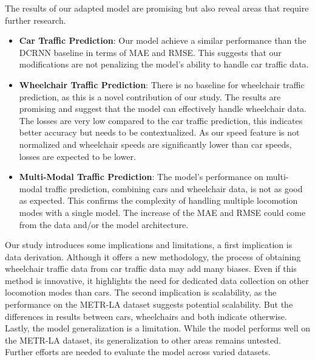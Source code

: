 The results of our adapted model are promising but also reveal areas that require further research.
\begin{itemize}
    \item \textbf{Car Traffic Prediction}:
    Our model achieve a similar performance than the DCRNN baseline in terms of MAE and RMSE\@.
    This suggests that our modifications are not penalizing the model's ability to handle car traffic data.
    \item \textbf{Wheelchair Traffic Prediction}:
    There is no baseline for wheelchair traffic prediction, as this is a novel contribution of our study.
    The results are promising and suggest that the model can effectively handle wheelchair data.
    The losses are very low compared to the car traffic prediction, this indicates better accuracy but needs to be contextualized.
    As our speed feature is not normalized and wheelchair speeds are significantly lower than car speeds, losses are expected to be lower.
    \item \textbf{Multi-Modal Traffic Prediction}:
    The model's performance on multi-modal traffic prediction, combining cars and wheelchair data, is not as good as expected.
    This confirms the complexity of handling multiple locomotion modes with a single model.
    The increase of the MAE and RMSE could come from the data and/or the model architecture.
\end{itemize}
\vspace{1em}

Our study introduces some implications and limitations, a first implication is data derivation.
Although it offers a new methodology, the process of obtaining wheelchair traffic data from car traffic data may add many biases.
Even if this method is innovative, it highlights the need for dedicated data collection on other locomotion modes than cars.
The second implication is scalability, as the performance on the METR-LA dataset suggests potential scalability.
But the differences in results between cars, wheelchairs and both indicate otherwise.
Lastly, the model generalization is a limitation.
While the model performs well on the METR-LA dataset, its generalization to other areas remains untested.
Further efforts are needed to evaluate the model across varied datasets.
\vspace{1em}

